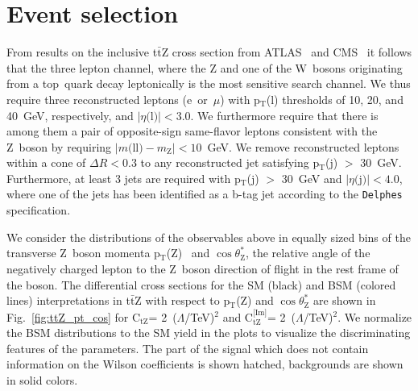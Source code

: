 \documentclass[letterpaper,11pt]{article}
\def\PZ{Z\xspace}
\def\PW{W\xspace}
\def\Pl{l}
\def\jet{j}
\def\ttZ{t$\bar{\text{t}}$Z\xspace}
\def\pT{p$_\text{T}$}
\def\pTZ{p$_\text{T}$(Z)\xspace}
\def\cosThetaStar{$\cos\theta^*_\text{Z}$\xspace}
\def\ctZ{C$_\text{tZ}$\xspace}
\def\ctZI{C$_\text{tZ}^\text{[Im]}$\xspace}
\def\delphes{\texttt{Delphes}\xspace}
\def\TeV{TeV\xspace}
\def\GeV{GeV\xspace}
\begin{document}
\section{Event selection}
\label{sec:selection}
From results on the inclusive \ttZ cross section from ATLAS~\cite{Aad:2015eua,ATLAS:2016ttVarticles} and CMS~\cite{PRL-110-172002,EPJC-C74-2014-9,JHEP-1601-2016-096,Sirunyan:2017uzs} it follows that the three lepton channel, where the \PZ and one of the \PW~bosons originating from a top~quark decay leptonically is the most sensitive search channel.
We thus require three reconstructed leptons (e~or~$\mu$) with \pT(\Pl) thresholds of 10, 20, and 40~\GeV, respectively, and $|\eta($\Pl$)|<3.0$.
We furthermore require that there is among them a pair of opposite-sign same-flavor leptons consistent with the \PZ~boson by requiring $|m($\Pl\Pl$)-m_\text{\PZ}|<10$~\GeV.
We remove reconstructed leptons within a cone of $\Delta R < 0.3$ to any reconstructed jet satisfying \pT(\jet) $>$ 30~\GeV.
Furthermore, at least 3 jets are required with \pT(\jet) $>$ 30~\GeV and $|\eta($\jet$)|<4.0$, where one of the jets has been identified as a b-tag jet according to the \delphes specification.

\noindent
We consider the distributions of the observables above in equally sized bins of the transverse \PZ~boson momenta \pTZ~\cite{Rontsch:2014cca} and \cosThetaStar, the relative angle of the negatively charged lepton to the \PZ~boson direction of flight in the rest frame of the boson.
The differential cross sections for the SM (black) and BSM (colored lines) interpretations in \ttZ with respect to \pTZ and \cosThetaStar are shown in Fig.~\ref{fig:ttZ_pt_cos} for \ctZ = 2~($\Lambda$/\TeV)$^2$ and \ctZI = 2~($\Lambda$/\TeV)$^2$.
We normalize the BSM distributions to the SM yield in the plots to visualize the discriminating features of the parameters.
The part of the signal which does not contain information on the Wilson coefficients is shown hatched, backgrounds are shown in solid colors.
\end{document}
